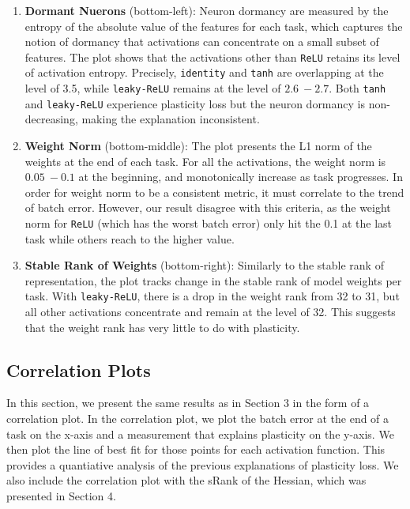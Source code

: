 \begin{enumerate}
    \item \textbf{Dormant Nuerons} (bottom-left):
    Neuron dormancy are measured by the entropy of the absolute value of the features for each task, which captures the notion of dormancy that activations can concentrate on a small subset of features.
    The plot shows that the activations other than \texttt{ReLU} retains its level of activation entropy.
    Precisely, \texttt{identity} and \texttt{tanh} are overlapping at the level of 3.5, while \texttt{leaky-ReLU} remains at the level of $2.6 ~- 2.7$.
    Both \texttt{tanh} and \texttt{leaky-ReLU} experience plasticity loss but the neuron dormancy is non-decreasing, making the explanation inconsistent.

    \item \textbf{Weight Norm} (bottom-middle):
    The plot presents the L1 norm of the weights at the end of each task.
    For all the activations, the weight norm is $0.05 ~- 0.1$ at the beginning, and monotonically increase as task progresses.
    In order for weight norm to be a consistent metric, it must correlate to the trend of batch error.
    However, our result disagree with this criteria, as the weight norm for \texttt{ReLU} (which has the worst batch error) only hit the 0.1 at the last task while others reach to the higher value.

    \item \textbf{Stable Rank of Weights} (bottom-right):
    Similarly to the stable rank of representation, the plot tracks change in the stable rank of model weights per task.
    With \texttt{leaky-ReLU}, there is a drop in the weight rank from 32 to 31, but all other activations concentrate and remain at the level of 32.
    This suggests that the weight rank has very little to do with plasticity.


\end{enumerate}

\newpage
  \subsection{Correlation Plots}
  In this section, we present the same results as in Section 3 in the form of a correlation plot. In the correlation plot, we plot the batch error at the end of a task on the x-axis and a measurement that explains plasticity on the y-axis. We then plot the line of best fit for those points for each activation function. This provides a quantiative analysis of the previous explanations of plasticity loss. We also include the correlation plot with the sRank of the Hessian, which was presented in Section 4.

